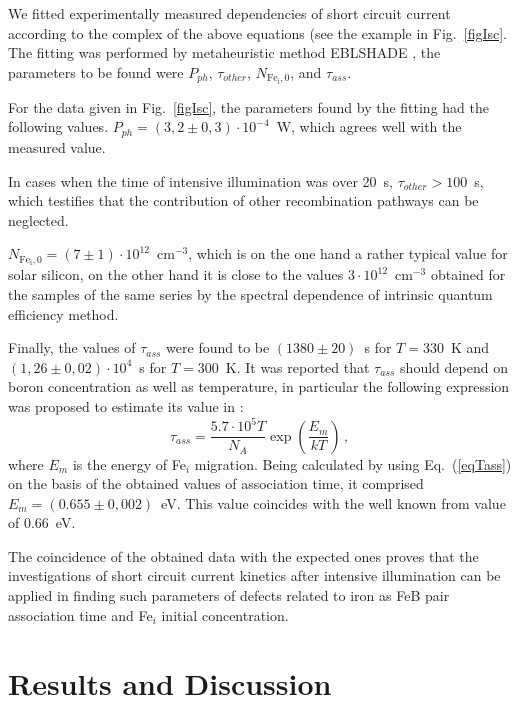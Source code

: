 We fitted experimentally measured dependencies of short circuit current
according to the complex of the above equations (see the example in Fig.~\ref{figIsc}.
The fitting was performed by metaheuristic method EBLSHADE \cite{EBLSHADE},
the parameters to be found were $P_{ph}$, $\tau_{other}$, $N_\mathrm{Fe_i,0}$, and $\tau_{ass}$.

For the data given in Fig.~\ref{figIsc},
the parameters found by the fitting had the following values.
$P_{ph}=(3,2\pm0,3)\cdot10^{-4}$~W, which agrees well with the measured value.

In cases when the time of intensive illumination was over 20~s,
$\tau_{other}>100$~s, which testifies that the contribution of other recombination pathways can be neglected.

$N_\mathrm{Fe_i,0}=(7\pm1)\cdot10^{12}$~cm$^{-3}$,
      which is on the one hand a rather typical value for solar silicon,
      on the other hand it is close to the values $3\cdot10^{12}$~cm$^{-3}$
      obtained for the samples of the same series by the spectral dependence of intrinsic quantum efficiency method.

Finally, the values of $\tau_{ass}$ were found
  to be $(1380\pm20)$~s for $T=330$~K and $(1,26\pm0,02)\cdot10^4$~s for $T=300$~K.
  It was reported that $\tau_{ass}$ should depend on boron concentration as well as temperature,
  in particular the following expression was proposed to estimate its value in \cite{FeBAssJAP2014}:
\begin{equation}
\label{eqTass}
\tau_{ass}=\frac{5.7\cdot10^5T}{N_A}\exp\left(\frac{E_m}{kT}\right)\,,
\end{equation}
where
$E_m$ is the energy of Fe$_i$ migration.
Being calculated by using Eq.~(\ref{eqTass}) on the basis of the obtained
values of association time, it comprised $E_m=(0.655\pm0,002)$~eV.
This value coincides with the well known from \cite{FeBAssJAP2014,FeBkinAPL2008} value  of 0.66~eV.

The coincidence of the obtained data with the expected ones
proves that the investigations of short circuit current kinetics
after intensive illumination can be applied in finding such parameters of defects related to iron
as FeB pair association time and Fe$_i$ initial concentration.

\section{Results and Discussion}


